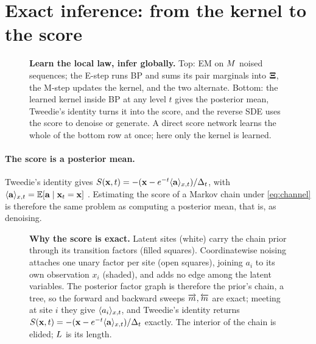 \section{Exact inference: from the kernel to the score}
\label{sec:inference}

\begin{figure}[t]
  \centering
  
  \caption{\textbf{Learn the local law, infer globally.} Top: EM on $M$ noised sequences;
  the E-step runs BP and sums its pair marginals into $\mathbf{\Xi}$, the M-step updates the kernel, and
  the two alternate. Bottom: the learned kernel inside BP at any level $t$ gives the posterior
  mean, Tweedie's identity turns it into the score, and the reverse SDE uses the score to
  denoise or generate. A direct score network learns the whole of the bottom row at once; here
  only the kernel is learned.}
  \label{fig:method}
\end{figure}

\paragraph{The score is a posterior mean.}
Tweedie's identity gives $S(\mathbf{x},t)=-(\mathbf{x}-e^{-t}\langle \mathbf{a} \rangle_{x,t})/\Delta_t$, with
$\langle \mathbf{a} \rangle_{x,t}=\mathbb{E}[\mathbf{a}\mid\mathbf{x}_t=\mathbf{x}]$ \citep{robbins1956empirical,efron2011tweedie}. Estimating the
score of a Markov chain under \cref{eq:channel} is therefore the same problem as computing
a posterior mean, that is, as denoising.

\begin{figure}[t]
  \centering
  
  \caption{\textbf{Why the score is exact.} Latent sites (white) carry the chain prior
  through its transition factors (filled squares). Coordinatewise noising attaches one
  unary factor per site (open squares), joining $a_i$ to its own observation $x_i$
  (shaded), and adds no edge among the latent variables. The posterior factor graph is
  therefore the prior's chain, a tree, so the forward and backward sweeps
  $\overrightarrow{m},\overleftarrow{m}$ are exact; meeting at site $i$ they give $\langle a_{i} \rangle_{x,t}$, and Tweedie's
  identity returns $S(\mathbf{x},t)=-(\mathbf{x}-e^{-t}\langle \mathbf{a} \rangle_{x,t})/\Delta_t$ exactly. The interior of
  the chain is elided; $L$ is its length.}
  \label{fig:mechanism}
\end{figure}

